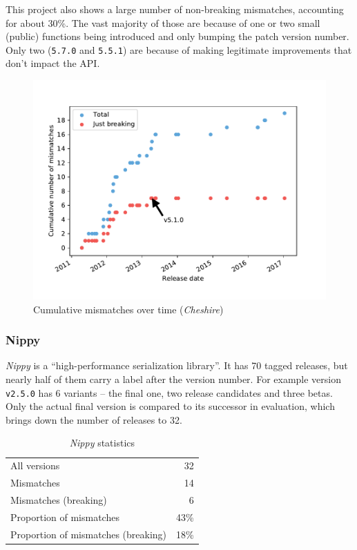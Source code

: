 \documentclass{l4proj}
\newcommand\genericstyle{\lstset{basicstyle=\ttm}}
\newcommand\codeinline[1]{{\genericstyle\lstinline!#1!}}
\begin{document}
This project also shows a large number of non-breaking mismatches,
accounting for about 30\%. The vast majority of those are because of
one or two small (public) functions being introduced and only bumping
the patch version number. Only two (\codeinline{5.7.0} and
\codeinline{5.5.1}) are because of making legitimate improvements that
don't impact the API.

\begin{figure}[H]
\centering
\includegraphics[height=0.4\textheight]{images/evaluation/cheshire_cumulative_mismatches}
\caption{Cumulative mismatches over time (\textit{Cheshire})}
\label{CheshireCumulativeMismatches}
\end{figure}

\subsubsection{Nippy}

\textit{Nippy} is a ``high-performance serialization library''. It has
70 tagged releases, but nearly half of them carry a label after the
version number. For example version \codeinline{v2.5.0} has 6 variants
-- the final one, two release candidates and three betas. Only the
actual final version is compared to its successor in evaluation, which
brings down the number of releases to 32.

\begin{table}
\centering
\caption{\textit{Nippy} statistics}
\label{NippyStats}
\begin{tabular}{|lr|}
All versions & 32 \\
Mismatches & 14 \\
Mismatches (breaking) & 6 \\
Proportion of mismatches & 43\% \\
Proportion of mismatches (breaking) & 18\% \\
\end{tabular}
\end{table}
\end{document}
